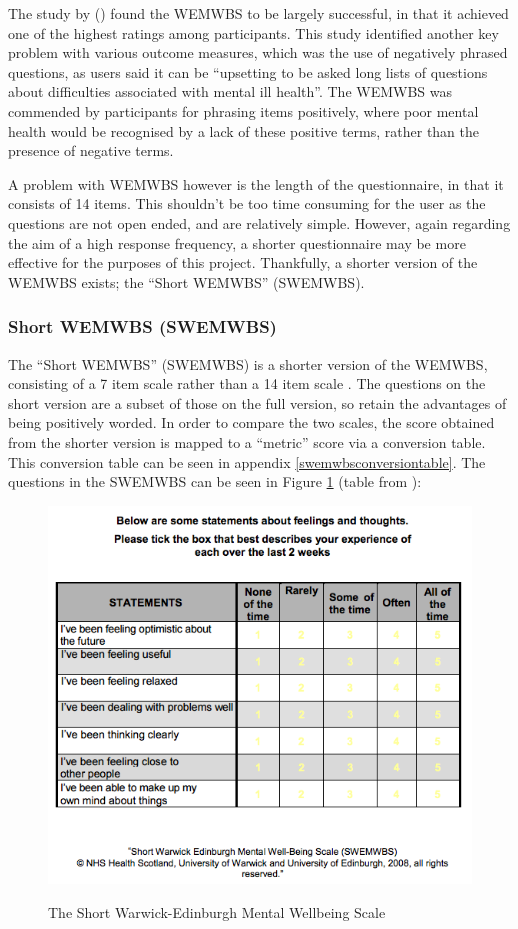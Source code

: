 \documentclass[11pt,openright,a4paper]{report}
\begin{document}
The study by \citeauthor{crawford2011selecting} (\citeyear{crawford2011selecting}) found the WEMWBS to be largely successful, in that it achieved one of the highest ratings among participants. This study identified another key problem with various outcome measures, which was the use of negatively phrased questions, as users said it can be \enquote{upsetting to be asked long lists of questions about difficulties associated with mental ill health}. The WEMWBS was commended by participants for phrasing items positively, where poor mental health would be recognised by a lack of these positive terms, rather than the presence of negative terms.

A problem with WEMWBS however is the length of the questionnaire, in that it consists of 14 items. This shouldn't be too time consuming for the user as the questions are not open ended, and are relatively simple. However, again regarding the aim of a high response frequency, a shorter questionnaire may be more effective for the purposes of this project. Thankfully, a shorter version of the WEMWBS exists; the \enquote{Short WEMWBS} (SWEMWBS).

\subsubsection{Short WEMWBS (SWEMWBS)} \label{swemwbssection}
The \enquote{Short WEMWBS} (SWEMWBS) is a shorter version of the WEMWBS, consisting of a 7 item scale rather than a 14 item scale \parencite{swemwbs}. The questions on the short version are a subset of those on the full version, so retain the advantages of being positively worded. In order to compare the two scales, the score obtained from the shorter version is mapped to a \enquote{metric} score via a conversion table. This conversion table can be seen in appendix \ref{swemwbsconversiontable}.
\newpage
The questions in the SWEMWBS can be seen in Figure \ref{fig:swemwbs} (table from \parencite{swemwbsquestions}):
\begin{figure}[ht]
\centering
\caption{The Short Warwick-Edinburgh Mental Wellbeing Scale}
\includegraphics[width=.8\textwidth]{i/swemwbs.png}
\label{fig:swemwbs}
\end{figure}
\end{document}
